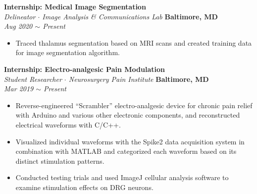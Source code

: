 \documentclass[10pt, letterpaper]{article}
\begin{document}
\begin{paracol}{2}
	\textbf{Internship: Medical Image Segmentation}\\
	\textit{Delineator $\cdot$ Image Analysis \& Communications Lab}
	\switchcolumn
	\raggedleft\textbf{Baltimore, MD}\\
	\raggedleft\textit{Aug 2020 $\sim$ Present}
\end{paracol}
\vspace{-5mm}
\begin{itemize}
	\item Traced thalamus segmentation based on MRI scans and created training data for image segmentation algorithm.
\end{itemize}
\vspace{-3mm} 

\begin{paracol}{2}
	\textbf{Internship: Electro-analgesic Pain Modulation}\\
	\textit{Student Researcher $\cdot$ Neurosurgery Pain Institute}
	\switchcolumn \hfill
	\raggedleft\textbf{Baltimore, MD}\\
	\raggedleft\textit{Mar 2019 $\sim$ Present}
\end{paracol}\vspace{-1mm}
\vspace{-3mm}
\begin{itemize}
	\item Reverse-engineered ``Scrambler'' electro-analgesic device for chronic pain relief with Arduino and various other electronic components, and reconstructed electrical waveforms with C/C++.\vspace{-3mm}
	\item Visualized individual waveforms with the Spike2 data acquisition system in combination with MATLAB and categorized each waveform based on its distinct stimulation patterns.\vspace{-3mm}
	\item Conducted testing trials and used ImageJ cellular analysis software to examine stimulation effects on DRG neurons.
\end{itemize}
\vspace{-3mm} 
\end{document}

